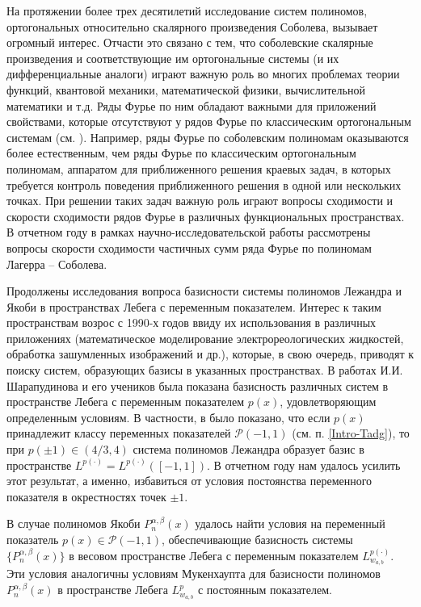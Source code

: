 
На протяжении более трех десятилетий исследование систем полиномов, ортогональных относительно скалярного произведения Соболева, вызывает огромный интерес. Отчасти это связано с тем, что соболевские скалярные произведения и соответствующие им ортогональные системы (и их дифференциальные аналоги) играют важную роль во многих проблемах теории функций, квантовой механики, математической физики, вычислительной математики и т.д. Ряды Фурье по ним обладают важными для приложений свойствами, которые отсутствуют у рядов Фурье по классическим ортогональным системам (см. \cite{Ram-Ba-Ra-Pe, Ram-Mar-Xu, mmg-SharapudinovUMN}).
Например, ряды Фурье по соболевским полиномам оказываются более естественным, чем ряды Фурье по классическим ортогональным полиномам, аппаратом для приближенного решения краевых задач, в которых требуется контроль поведения приближенного решения в одной или нескольких точках.
При решении таких задач важную роль играют вопросы сходимости и скорости сходимости рядов Фурье в различных функциональных пространствах. В отчетном году в рамках научно-исследовательской работы рассмотрены вопросы скорости сходимости частичных сумм ряда Фурье по полиномам Лагерра -- Соболева.


Продолжены исследования вопроса базисности системы полиномов Лежандра и Якоби в пространствах Лебега с переменным показателем. Интерес к таким пространствам возрос с 1990-х годов ввиду их использования в различных приложениях (математическое моделирование электрореологических жидкостей, обработка зашумленных изображений и др.), которые, в свою очередь, приводят к поиску систем, образующих базисы в указанных пространствах. В работах И.И. Шарапудинова и его учеников \cite{tad-SHII-Haar, tad-SHII-AnalisysMath, tad-SHII-Leg, tad-MMG-Haar, tad-SHII-Jacob, tad-SHII-Ult, tad-RAM-Jacob} была показана базисность различных систем в пространстве Лебега с переменным показателем $p(x)$, удовлетворяющим определенным условиям.
В частности, в \cite{tad-SHII-Leg} было показано, что если $p(x)$ принадлежит классу переменных показателей $\mathcal{P}(-1,1)$ (см. п. \ref{Intro-Tadg}),
то при $p(\pm1)\in (4/3, 4)$ система полиномов Лежандра образует базис в пространстве $L^{p(\cdot)}=L^{p(\cdot)}([-1,1])$. В отчетном году нам удалось усилить этот результат, а именно, избавиться от условия постоянства переменного показателя в окрестностях точек $\pm1$.

В случае полиномов Якоби $P_n^{\alpha,\beta}(x)$ удалось найти условия на переменный показатель $p(x)\in \mathcal{P}(-1,1)$, обеспечивающие базисность системы $\{P_n^{\alpha,\beta}(x)\}$ в весовом пространстве Лебега с переменным показателем $L^{p(\cdot)}_{w_{a,b}}$. Эти условия аналогичны условиям Мукенхаупта для базисности полиномов $P_n^{\alpha,\beta}(x)$ в пространстве Лебега $L^{p}_{w_{a,b}}$ с постоянным показателем.


